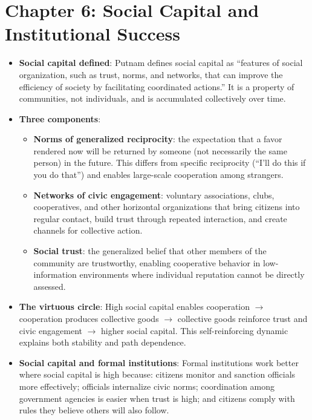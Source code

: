 \documentclass[12pt]{article}
\begin{document}
\section{Chapter 6: Social Capital and Institutional Success}

\begin{itemize}[leftmargin=*, itemsep=4pt]
    \item \textbf{Social capital defined}: Putnam defines social capital as ``features of social organization, such as trust, norms, and networks, that can improve the efficiency of society by facilitating coordinated actions.'' It is a property of communities, not individuals, and is accumulated collectively over time.
    \item \textbf{Three components}:
        \begin{itemize}
            \item \textbf{Norms of generalized reciprocity}: the expectation that a favor rendered now will be returned by someone (not necessarily the same person) in the future. This differs from specific reciprocity (``I'll do this if you do that'') and enables large-scale cooperation among strangers.
            \item \textbf{Networks of civic engagement}: voluntary associations, clubs, cooperatives, and other horizontal organizations that bring citizens into regular contact, build trust through repeated interaction, and create channels for collective action.
            \item \textbf{Social trust}: the generalized belief that other members of the community are trustworthy, enabling cooperative behavior in low-information environments where individual reputation cannot be directly assessed.
        \end{itemize}
    \item \textbf{The virtuous circle}: High social capital enables cooperation $\to$ cooperation produces collective goods $\to$ collective goods reinforce trust and civic engagement $\to$ higher social capital. This self-reinforcing dynamic explains both stability and path dependence.
    \item \textbf{Social capital and formal institutions}: Formal institutions work better where social capital is high because: citizens monitor and sanction officials more effectively; officials internalize civic norms; coordination among government agencies is easier when trust is high; and citizens comply with rules they believe others will also follow.

\end{itemize}
\end{document}
